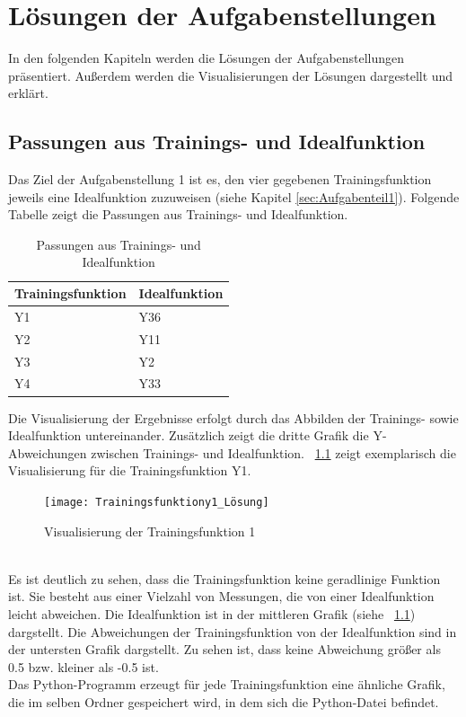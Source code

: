 \documentclass[11pt,a4paper]{scrreprt}
\newcommand{\abbildung}[1]{\figurename\ \ref{#1}}
\begin{document}
\chapter{Lösungen der Aufgabenstellungen}
\label{cha:Lösung}
In den folgenden Kapiteln werden die Lösungen der Aufgabenstellungen präsentiert. Außerdem werden die Visualisierungen der Lösungen dargestellt und erklärt. 

\section{Passungen aus Trainings- und Idealfunktion}
Das Ziel der Aufgabenstellung 1 ist es, den vier gegebenen Trainingsfunktion jeweils eine Idealfunktion zuzuweisen (siehe Kapitel \ref{sec:Aufgabenteil1}). Folgende Tabelle zeigt die Passungen aus Trainings- und Idealfunktion. 

\begin{table}[!h]
\centering
\begin{tabularx}{0.5\textwidth}{|l|X|}
\hline
\textbf{Trainingsfunktion} & \textbf{Idealfunktion}\\
\hline
Y1 & Y36\\
\hline
Y2 & Y11\\
\hline
Y3 & Y2\\
\hline
Y4 & Y33\\
\hline
\end{tabularx}
\caption{Passungen aus Trainings- und Idealfunktion}
\label{tab:Passungen}
\end{table}
Die Visualisierung der Ergebnisse erfolgt durch das Abbilden der Trainings- sowie Idealfunktion untereinander. Zusätzlich zeigt die dritte Grafik die Y-Abweichungen zwischen Trainings- und Idealfunktion. \abbildung{fig:Train1} zeigt exemplarisch die Visualisierung für die Trainingsfunktion Y1.
\begin{figure}[!h]
	\centering
	\texttt{[image: Trainingsfunktiony1\_Lösung]}
	\caption{Visualisierung der Trainingsfunktion 1}
	\label{fig:Train1}
\end{figure}
\\
Es ist deutlich zu sehen, dass die Trainingsfunktion keine geradlinige Funktion ist. Sie besteht aus einer Vielzahl von Messungen, die von einer Idealfunktion leicht abweichen. Die Idealfunktion ist in der mittleren Grafik (siehe \abbildung{fig:Train1}) dargstellt. Die Abweichungen der Trainingsfunktion von der Idealfunktion sind in der untersten Grafik dargstellt. Zu sehen ist, dass keine Abweichung größer als 0.5 bzw. kleiner als -0.5 ist.\\
Das Python-Programm erzeugt für jede Trainingsfunktion eine ähnliche Grafik, die im selben Ordner gespeichert wird, in dem sich die Python-Datei befindet. 
\end{document}
